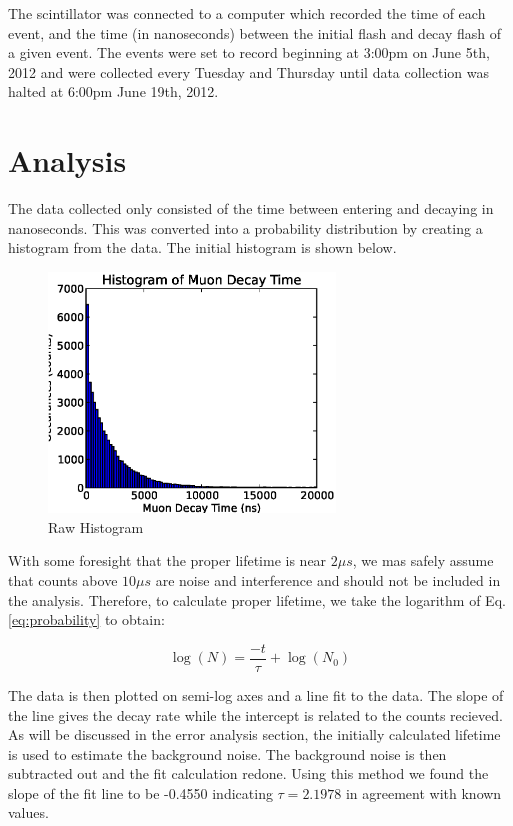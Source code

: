 \documentclass[12pt,twocolumn]{article}
\begin{document}
The scintillator was connected to a computer which recorded the time of each event, and the time (in nanoseconds) between
the initial flash and decay flash of a given event. The events were set to record beginning at 3:00pm on June 5th, 2012
and were collected every Tuesday and Thursday until data collection was halted at 6:00pm June 19th, 2012.

\section{Analysis}

The data collected only consisted of the time between entering and decaying in nanoseconds. This was converted into a 
probability distribution by creating a histogram from the data. The initial histogram is shown below.

\begin{figure}[h!]
	\centering
	\includegraphics[width=3in]{images/Histogram}
	\caption{Raw Histogram}
	\label{fig:Histogram}
\end{figure}

With some foresight that the proper lifetime is near $2\mu s$, we mas safely assume that counts above $10\mu s$ are
noise and interference and should not be included in the analysis. Therefore, to calculate proper lifetime, we take
the logarithm of Eq. \ref{eq:probability} to obtain:

 \begin{equation}
	 \label{eq:probability}
	 \log(N)=\frac{-t}{\tau} + \log(N_{0})
 \end{equation}

 The data is then plotted on semi-log axes and a line fit to the data. The slope of the line gives the decay rate while
 the intercept is related to the counts recieved. As will be discussed in the error analysis section, the initially 
 calculated lifetime is used to estimate the background noise. The background noise is then subtracted out and the fit
 calculation redone. Using this method we found the slope of the fit line to be -0.4550 indicating $\tau=2.1978$ in
 agreement with known values.
\end{document}
